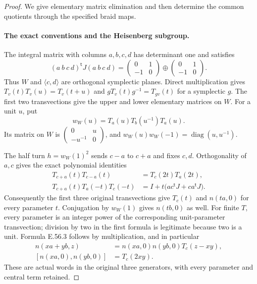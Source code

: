 \begin{proof}
We give elementary matrix elimination and then determine
the common quotients through the specified braid maps.

\paragraph{The exact conventions and the Heisenberg subgroup.}
The integral matrix with columns $a,b,c,d$ has determinant
one and satisfies
\[
 (a\ b\ c\ d)^{\mathsf t}J(a\ b\ c\ d)
       =\begin{pmatrix}0&1\\-1&0\end{pmatrix}
                       \oplus
        \begin{pmatrix}0&1\\-1&0\end{pmatrix}.
 \tag{E.56.7}
\]
Thus $W$ and $\langle c,d\rangle$ are orthogonal
symplectic planes. Direct multiplication gives
$T_v(t)T_v(u)=T_v(t+u)$ and
$gT_v(t)g^{-1}=T_{gv}(t)$ for a symplectic $g$.
The first two transvections give the upper and lower
elementary matrices on $W$. For a unit $u$, put
\[
 w_W(u)=T_a(u)T_b(u^{-1})T_a(u).
 \tag{E.56.8}
\]
Its matrix on $W$ is
$\left(\begin{smallmatrix}0&u\\-u^{-1}&0\end{smallmatrix}\right)$,
and $w_W(u)w_W(-1)=\operatorname{diag}(u,u^{-1})$.

The half turn $h=w_W(1)^2$ sends $c-a$ to $c+a$
and fixes $c,d$. Orthogonality of $a,c$ gives the
exact polynomial identities
\[
 \begin{split}
 T_{c+a}(t)T_{c-a}(t)&=T_c(2t)T_a(2t),\\
 T_{c+a}(t)T_a(-t)T_c(-t)
      &=I+t\bigl(a c^{\mathsf t}J+c a^{\mathsf t}J\bigr).
 \end{split}
 \tag{E.56.9}
\]
Consequently the first three original transvections
give $T_c(t)$ and $n(ta,0)$ for every parameter $t$.
Conjugation by $w_W(1)$ gives $n(tb,0)$ as well.
For finite $T$, every parameter is an integer power
of the corresponding unit-parameter transvection;
division by two in the first formula is legitimate
because two is a unit. Formula E.56.3 follows by
multiplication, and in particular
\[
 \begin{split}
 n(xa+yb,z)&=n(xa,0)n(yb,0)T_c(z-xy),\\
 [n(xa,0),n(yb,0)]&=T_c(2xy).
 \end{split}
 \tag{E.56.10}
\]
These are actual words in the original three
generators, with every parameter and central term
retained.


\end{proof}
